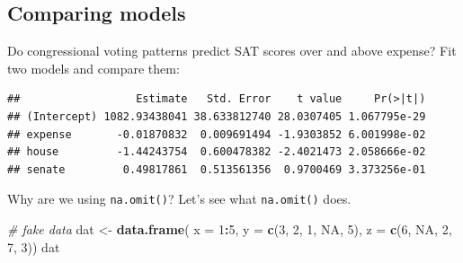 \documentclass[]{book}
\newenvironment{Shaded}{\begin{snugshade}}{\end{snugshade}}
\newcommand{\CommentTok}[1]{\textcolor[rgb]{0.56,0.35,0.01}{\textit{#1}}}
\newcommand{\DataTypeTok}[1]{\textcolor[rgb]{0.13,0.29,0.53}{#1}}
\newcommand{\DecValTok}[1]{\textcolor[rgb]{0.00,0.00,0.81}{#1}}
\newcommand{\KeywordTok}[1]{\textcolor[rgb]{0.13,0.29,0.53}{\textbf{#1}}}
\newcommand{\NormalTok}[1]{#1}
\newcommand{\OperatorTok}[1]{\textcolor[rgb]{0.81,0.36,0.00}{\textbf{#1}}}
\newcommand{\OtherTok}[1]{\textcolor[rgb]{0.56,0.35,0.01}{#1}}
\newcommand{\StringTok}[1]{\textcolor[rgb]{0.31,0.60,0.02}{#1}}
\begin{document}
\hypertarget{comparing-models}{%
\subsection{Comparing models}\label{comparing-models}}

Do congressional voting patterns predict SAT scores over and above expense? Fit two models and compare them:

\begin{Shaded}
\end{Shaded}

\begin{verbatim}
##                  Estimate   Std. Error    t value     Pr(>|t|)
## (Intercept) 1082.93438041 38.633812740 28.0307405 1.067795e-29
## expense       -0.01870832  0.009691494 -1.9303852 6.001998e-02
## house         -1.44243754  0.600478382 -2.4021473 2.058666e-02
## senate         0.49817861  0.513561356  0.9700469 3.373256e-01
\end{verbatim}

Why are we using \texttt{na.omit()}? Let's see what \texttt{na.omit()} does.

\begin{Shaded}
\begin{Highlighting}[]
\CommentTok{# fake data}
\NormalTok{dat <-}\StringTok{ }\KeywordTok{data.frame}\NormalTok{(}
  \DataTypeTok{x =} \DecValTok{1}\OperatorTok{:}\DecValTok{5}\NormalTok{,}
  \DataTypeTok{y =} \KeywordTok{c}\NormalTok{(}\DecValTok{3}\NormalTok{, }\DecValTok{2}\NormalTok{, }\DecValTok{1}\NormalTok{, }\OtherTok{NA}\NormalTok{, }\DecValTok{5}\NormalTok{),}
  \DataTypeTok{z =} \KeywordTok{c}\NormalTok{(}\DecValTok{6}\NormalTok{, }\OtherTok{NA}\NormalTok{, }\DecValTok{2}\NormalTok{, }\DecValTok{7}\NormalTok{, }\DecValTok{3}\NormalTok{))}
\NormalTok{dat}
\end{Highlighting}
\end{Shaded}
\end{document}
